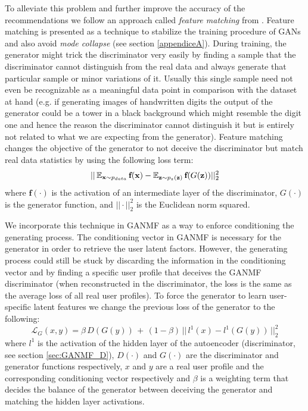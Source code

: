 To alleviate this problem and further improve the accuracy of the recommendations we follow an approach called \emph{feature matching} from \cite{salimans2016improved}. Feature matching is presented as a technique to stabilize the training procedure of GANs and also avoid \emph{mode collapse} (see section \ref{appendiceA}). During training, the generator might trick the discriminator very easily by finding a sample that the discriminator cannot distinguish from the real data and always generate that particular sample or minor variations of it. Usually this single sample need not even be recognizable as a meaningful data point in comparison with the dataset at hand (e.g. if generating images of handwritten digits the output of the generator could be a tower in a black background which might resemble the digit one and hence the reason the discriminator cannot distinguish it but is entirely not related to what we are expecting from the generator). Feature matching changes the objective of the generator to not deceive the discriminator but match real data statistics by using the following loss term:
\[
||\operatorname{\mathbb{E}}_{\textbf{x} \sim{p_{data}}} \textbf{f}(\textbf{x}) - \operatorname{\mathbb{E}}_{\textbf{z} \sim{p_{z}(\textbf{z})}} \textbf{f}(G(\textbf{z}))||^2_{2}
\]
where $\textbf{f}(\cdot)$ is the activation of an intermediate layer of the discriminator, $G(\cdot)$ is the generator function, and $||\cdot||^2_{2}$ is the Euclidean norm squared.

We incorporate this technique in GANMF as a way to enforce conditioning the generating process. The conditioning vector in GANMF is necessary for the generator in order to retrieve the user latent factors. However, the generating process could still be stuck by discarding the information in the conditioning vector and by finding a specific user profile that deceives the GANMF discriminator (when reconstructed in the discriminator, the loss is the same as the average loss of all real user profiles). To force the generator to learn user-specific latent features we change the previous loss of the generator to the following:
\begin{equation}
    \mathcal{L}_{G}(x, y) = \beta \, D(G(y)) \, + \, (1-\beta) \, || \, l^1(x) - l^1(G(y)) \,||^2_{2}
    \label{eq:generator_loss_feature}
\end{equation}
where $l^1$ is the activation of the hidden layer of the autoencoder (discriminator, see section \ref{sec:GANMF_D}), $D(\cdot)$ and $G(\cdot)$ are the discriminator and generator functions respectively, $x$ and $y$ are a real user profile and the corresponding conditioning vector respectively and $\beta$ is a weighting term that decides the balance of the generator between deceiving the generator and matching the hidden layer activations.

